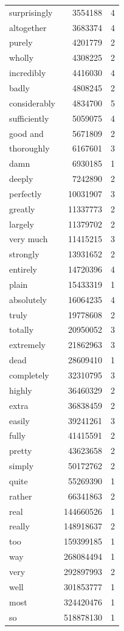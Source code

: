 \begin{table}[hbt]
\begin{center}
\begin{tabular}{lrc}
    surprisingly & 3554188 & 4 \\ 
    altogether & 3683374 & 4 \\ 
    purely & 4201779 & 2 \\ 
    wholly & 4308225 & 2 \\ 
    incredibly & 4416030 & 4 \\ 
    badly & 4808245 & 2 \\ 
    considerably & 4834700 & 5 \\ 
    sufficiently & 5059075 & 4 \\ 
    good and & 5671809 & 2 \\ 
    thoroughly & 6167601 & 3 \\ 
    damn & 6930185 & 1 \\ 
    deeply & 7242890 & 2 \\ 
    perfectly & 10031907 & 3 \\ 
    greatly & 11337773 & 2 \\ 
    largely & 11379702 & 2 \\ 
    very much & 11415215 & 3 \\ 
    strongly & 13931652 & 2 \\ 
    entirely & 14720396 & 4 \\ 
    plain & 15433319 & 1 \\ 
    absolutely & 16064235 & 4 \\ 
    truly & 19778608 & 2 \\ 
    totally & 20950052 & 3 \\ 
    extremely & 21862963 & 3 \\ 
    dead & 28609410 & 1 \\ 
    completely & 32310795 & 3 \\ 
    highly & 36460329 & 2 \\ 
    extra & 36838459 & 2 \\ 
    easily & 39241261 & 3 \\ 
    fully & 41415591 & 2 \\ 
    pretty & 43623658 & 2 \\ 
    simply & 50172762 & 2 \\ 
    quite & 55269390 & 1 \\ 
    rather & 66341863 & 2 \\ 
    real & 144660526 & 1 \\ 
    really & 148918637 & 2 \\ 
    too & 159399185 & 1 \\ 
    way & 268084494 & 1 \\ 
    very & 292897993 & 2 \\ 
    well & 301853777 & 1 \\ 
    most & 324420476 & 1 \\ 
    so & 518878130 & 1 \\
   \hline
  \end{tabular}
 \end{center}
\end{table}

\renewcommand{\baselinestretch}{1.0}